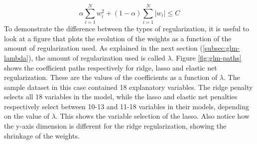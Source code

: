 $$
\alpha \sum_{i=1}^{N}w_{i}^{2} + (1-\alpha)\sum_{i=1}^{N}\lvert w_{i}\rvert \leq C
$$
To demonstrate the difference between the types of regularization, it is useful to look at a figure that plots the evolution of the weights as a function of the amount of regularization used. As explained in the next section (\ref{subsec:glm-lambda}), the amount of regularization used is called $\lambda$. Figure \ref{fig:glm-paths} shows the coefficient paths respectively for ridge, lasso and elastic net regularization. These are the values of the coefficients as a function of $\lambda$. The sample dataset in this case contained 18 explanatory variables. The ridge penalty selects all 18 variables in the model, while the lasso and elastic net penalties respectively select between 10-13 and 11-18 variables in their models, depending on the value of $\lambda$. This shows the variable selection of the lasso. Also notice how the y-axis dimension is different for the ridge regularization, showing the shrinkage of the weights.
